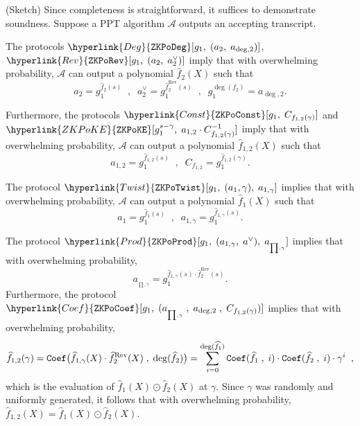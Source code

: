 \documentclass[11pt, lettersize, notitlepage, leqno, footskip=0.6cm]{article}
\newcommand{\mc}{\mathcal}
\newcommand{\mr}{\mathrm}
\newcommand{\what}{\widehat}
\newcommand{\vs}{\vspace{-0.15cm}}
\newcommand{\noin}{\noindent}
\newcommand{\op}{overwhelming probability}
\numberwithin{equation}{section}
\begin{document}
\begin{prf} (Sketch) Since completeness is straightforward, it suffices to demonstrate soundness. Suppose a PPT algorithm $\mc{A}$ outputs an accepting transcript. 

The protocols $\hyperlink{Deg}{\tt{ZKPoDeg}}[g_1,\;(a_2, \;a_{\deg,2})]$, $\hyperlink{Rev}{\tt{ZKPoRev}}[g_1,\;(a_2,\;a_2^{\vee})]$ imply that with \op, $\mc{A}$ can output a polynomial $\what{f}_2(X)$ such that \vs $$ a_2 = g_1^{\what{f}_2(s)}\;\;,\;\; a_2^{\vee} = g_1^{\what{f}_2^{\mr{Rev}}(s)} \;\;,\;\; g_1^{\deg(f_2)} = a_{\deg,2} .    $$  

\noin Furthermore, the protocols $\hyperlink{Const}{\tt{ZKPoConst}}[g_1,\;C_{f_{1,2}(\gamma)}]$ and $\hyperlink{ZKPoKE}{\tt{ZKPoKE}}[g_1^{s-\gamma},\; a_{1,2}\cdot C_{f_{1,2}(\gamma)}^{-1}]$ imply that with \op, $\mc{A}$ can output a polynomial $\what{f}_{1,2}(X)$ such that \vs  $$  a_{1,2} =  g_1^{\what{f}_{1,2}(s)}\;\;,\;\; C_{f_{1,2}} = g_1^{\what{f}_{1,2}(\gamma)} .$$ 

\noin The protocol $\hyperlink{Twist}{\tt{ZKPoTwist}}[g_1,\;(a_1,\gamma),\;a_{1,\gamma}]$ implies that with \op, $\mc{A}$ can output a polynomial $\what{f}_1(X)$ such that \vs $$ a_1 = g_1^{\what{f}_1(s)}\;\;,\;\; a_{1,\gamma} = g_1^{\what{f}_{1,\gamma}(s)} . $$

\noin The protocol $\hyperlink{Prod}{\tt{ZKPoProd}}[g_1,\;(a_{1,\gamma}, \;a^{\vee}),\; a_{_{\prod , \gamma}}]$ implies that with \op, \vs $$ a_{_{\prod , \gamma}} = g_1^{\what{f}_{1,\gamma}(s)\cdot \what{f}_2^{\mr{Rev}}(s)}.$$ Furthermore, the protocol $\hyperlink{Coef}{\tt{ZKPoCoef}}[g_1,\;( a_{_{\prod , \gamma}}\;, \;a_{\deg,2}\;,\; C_{f_{1,2}(\gamma)})]$ implies that with \op, \vs $$ \what{f}_{1,2}(\gamma) =  {\tt{Coef}}\big(\what{f}_{1,\gamma}(X)\cdot \what{f}_2^{\mr{Rev}}(X)\;,\; \deg(\what{f}_2)\big) = \sum\limits_{i=0}^{\deg(\what{f}_1)} {\tt{Coef}}(\what{f}_1\;,\;i)\cdot {\tt{Coef}}(\what{f}_2\;,\;i) \cdot \gamma^i\;\;,$$ which is the evaluation of $\what{f}_1(X)\odot \what{f}_2(X)$ at $\gamma$. Since $\gamma$ was randomly and uniformly generated, it follows that with \op, $\what{f}_{1,2}(X) = \what{f}_1(X)\odot \what{f}_2(X)$. \end{prf}
\end{document}
